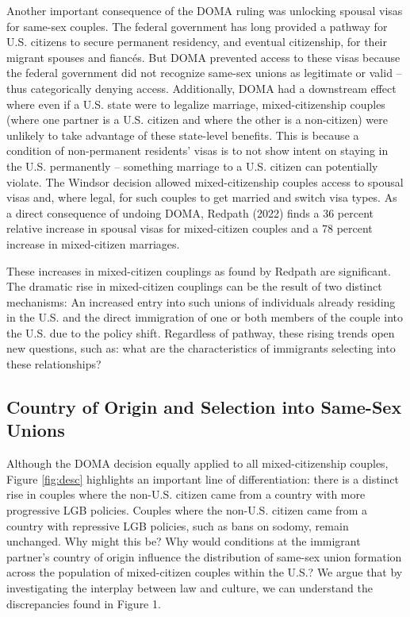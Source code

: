 \documentclass[
  12pt,
]{article}
\begin{document}
Another important consequence of the DOMA ruling was unlocking spousal visas for same-sex couples. The federal government has long provided a pathway for U.S. citizens to secure permanent residency, and eventual citizenship, for their migrant spouses and fiancés. But DOMA prevented access to these visas because the federal government did not recognize same-sex unions as legitimate or valid -- thus categorically denying access. Additionally, DOMA had a downstream effect where even if a U.S. state were to legalize marriage, mixed-citizenship couples (where one partner is a U.S. citizen and where the other is a non-citizen) were unlikely to take advantage of these state-level benefits. This is because a condition of non-permanent residents' visas is to not show intent on staying in the U.S. permanently -- something marriage to a U.S. citizen can potentially violate. The Windsor decision allowed mixed-citizenship couples access to spousal visas and, where legal, for such couples to get married and switch visa types. As a direct consequence of undoing DOMA, Redpath (2022) finds a 36 percent relative increase in spousal visas for mixed-citizen couples and a 78 percent increase in mixed-citizen marriages.

These increases in mixed-citizen couplings as found by Redpath are significant. The dramatic rise in mixed-citizen couplings can be the result of two distinct mechanisms: An increased entry into such unions of individuals already residing in the U.S. and the direct immigration of one or both members of the couple into the U.S. due to the policy shift. Regardless of pathway, these rising trends open new questions, such as: what are the characteristics of immigrants selecting into these relationships?

\hypertarget{country-of-origin-and-selection-into-same-sex-unions}{%
\subsection{Country of Origin and Selection into Same-Sex Unions}\label{country-of-origin-and-selection-into-same-sex-unions}}

Although the DOMA decision equally applied to all mixed-citizenship couples, Figure \ref{fig:desc} highlights an important line of differentiation: there is a distinct rise in couples where the non-U.S. citizen came from a country with more progressive LGB policies. Couples where the non-U.S. citizen came from a country with repressive LGB policies, such as bans on sodomy, remain unchanged. Why might this be? Why would conditions at the immigrant partner's country of origin influence the distribution of same-sex union formation across the population of mixed-citizen couples within the U.S.? We argue that by investigating the interplay between law and culture, we can understand the discrepancies found in Figure 1.
\end{document}
